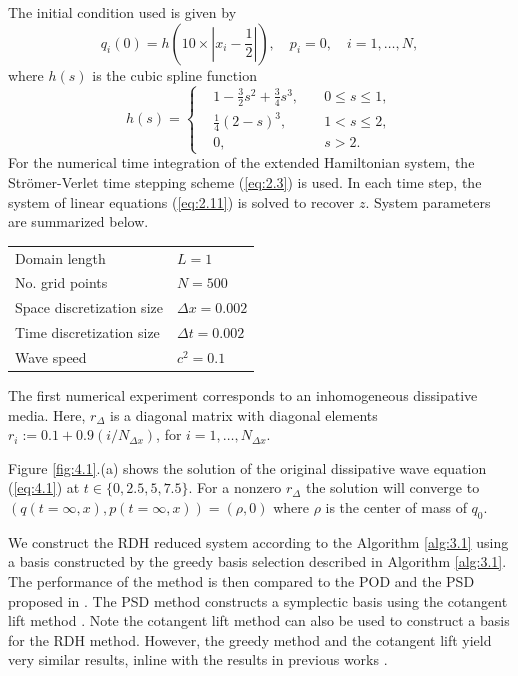 The initial condition used is given by
\begin{equation} \label{eq:4.5}
	q_i(0) = h( 10\times|x_i - \frac{1}{2}| ), \quad p_i = 0, \quad i=1,\dots,N,
\end{equation}
where $h(s)$ is the cubic spline function
\begin{equation} \label{eq:4.6}
h(s) = 
\left\{
\begin{aligned}
& 1 - \frac{3}{2}s^2 + \frac{3}{4}s^3, \quad & 0\leq s \leq 1, \\
& \frac{1}{4}(2-s)^3, & 1< s \leq 2, \\
& 0, & s > 2.
\end{aligned}
\right.
\end{equation}
For the numerical time integration of the extended Hamiltonian system, the Str\"omer-Verlet time stepping scheme (\ref{eq:2.3}) is used. In each time step, the system of linear equations (\ref{eq:2.11}) is solved to recover $z$. System parameters are summarized below.
\vspace{0.5cm}
\begin{center}
\begin{tabular}{|l|l|}
\hline
Domain length & $L = 1$ \\
No. grid points & $N = 500$ \\
Space discretization size & $\Delta x = 0.002$ \\
Time discretization size & $\Delta t = 0.002$ \\
Wave speed & $c^2 = 0.1$ \\
\hline
\end{tabular}
\end{center}
\vspace{0.5cm}
The first numerical experiment corresponds to an inhomogeneous dissipative media. Here, $r_{\Delta}$ is a diagonal matrix with diagonal elements $r_i := 0.1 + 0.9(i/N_{\Delta x})$, for $i=1,\dots,N_{\Delta x}$.

Figure \ref{fig:4.1}.(a) shows the solution of the original dissipative wave equation (\ref{eq:4.1}) at $t \in \{0,2.5,5,7.5\}$. For a nonzero $r_\Delta$ the solution will converge to $(q(t=\infty,x),p(t=\infty,x)) = (\rho,0)$ where $\rho$ is the center of mass of $q_0$. 

{\edit
We construct the RDH reduced system according to the Algorithm \ref{alg:3.1} using a basis constructed by the greedy basis selection described in Algorithm \ref{alg:3.1}. The performance of the method is then compared to the POD and the PSD proposed in \cite{peng2016geometric}. The PSD method constructs a symplectic basis using the cotangent lift method \cite{peng2016geometric}. Note the cotangent lift method can also be used to construct a basis for the RDH method. However, the greedy method and the cotangent lift yield very similar results, inline with the results in previous works \cite{Maboudi:2016}.
}

